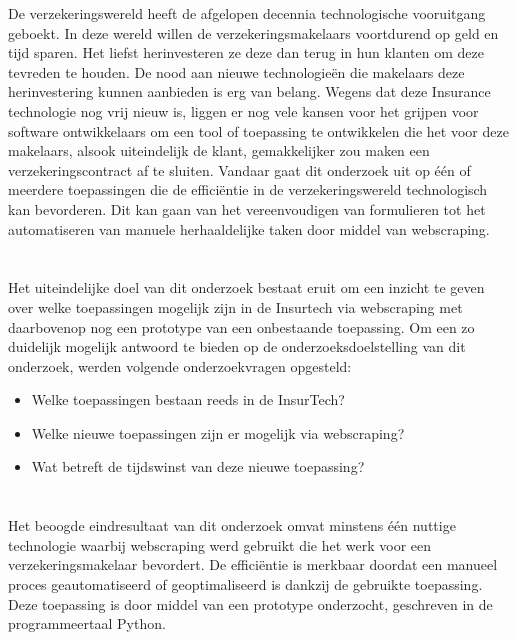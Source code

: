 De verzekeringswereld heeft de afgelopen decennia technologische vooruitgang geboekt.
In deze wereld willen de verzekeringsmakelaars voortdurend op geld en tijd sparen. Het liefst herinvesteren ze deze dan terug in hun klanten om deze tevreden te houden. De nood aan nieuwe technologieën die makelaars deze herinvestering kunnen aanbieden is erg van belang. Wegens dat deze Insurance technologie nog vrij nieuw is, liggen er nog vele kansen voor het grijpen voor software ontwikkelaars om een tool of toepassing te ontwikkelen die het voor deze makelaars, alsook uiteindelijk de klant, gemakkelijker zou maken een verzekeringscontract af te sluiten. Vandaar gaat dit onderzoek uit op één of meerdere toepassingen die de efficiëntie in de verzekeringswereld technologisch kan bevorderen. Dit kan gaan van het vereenvoudigen van formulieren tot het automatiseren van manuele herhaaldelijke taken door middel van webscraping.

\section{}
\label{sec:onderzoeksvraag}

Het uiteindelijke doel van dit onderzoek bestaat eruit om een inzicht te geven over welke toepassingen mogelijk zijn in de Insurtech via webscraping met daarbovenop nog een prototype van een onbestaande toepassing. Om een zo duidelijk mogelijk antwoord te bieden op de onderzoeksdoelstelling van dit onderzoek, werden volgende onderzoekvragen opgesteld:
\begin{itemize}
	\item Welke toepassingen bestaan reeds in de InsurTech?
	\item Welke nieuwe toepassingen zijn er mogelijk via webscraping?
	\item Wat betreft de tijdswinst van deze nieuwe toepassing?
\end{itemize}

\section{}
\label{sec:onderzoeksdoelstelling}

Het beoogde eindresultaat van dit onderzoek omvat minstens één nuttige technologie waarbij webscraping werd gebruikt die het werk voor een verzekeringsmakelaar bevordert. De efficiëntie is merkbaar doordat een manueel proces geautomatiseerd of geoptimaliseerd is dankzij de gebruikte toepassing. Deze toepassing is door middel van een prototype onderzocht, geschreven in de programmeertaal Python.

